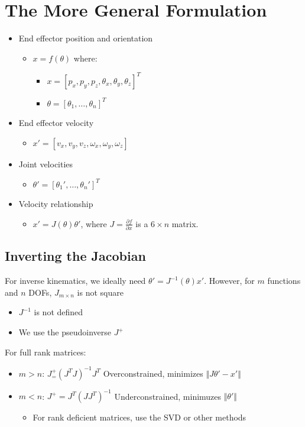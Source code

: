 \documentclass{article}
\begin{document}
\section*{The More General Formulation}
\begin{itemize}
    \item End effector position and orientation
    \begin{itemize}
        \item $x = f(\theta)$ where:
        \begin{itemize}
            \item $x = [p_x, p_y, p_z, \theta_x, \theta_y, \theta_z]^T$
            \item $\theta = [\theta_1, \dots, \theta_n]^T$
        \end{itemize}
    \end{itemize}
    \item End effector velocity
    \begin{itemize}
        \item $x' = [v_x, v_y, v_z, \omega_x, \omega_y, \omega_z]$
    \end{itemize}
    \item Joint velocities
    \begin{itemize}
        \item $\theta' = [\theta_1', \dots, \theta_n']^T$
    \end{itemize}
    \item Velocity relationship
    \begin{itemize}
        \item $x' = J(\theta) \theta'$, where $J = \frac{\partial f}{\partial x}$ is a $6 \times n$ matrix.
    \end{itemize}
\end{itemize}

\subsection*{Inverting the Jacobian}
For inverse kinematics, we ideally need $\theta' = J^{-1}(\theta)x'$.  However, for $m$ functions and $n$ DOFs, $J_{m \times n}$ is not square
\begin{itemize}
    \item $J^{-1}$ is not defined
    \item We use the pseudoinverse $J^+$
\end{itemize}
For full rank matrices:
\begin{itemize}
    \item $m > n$: $J^+_ = (J^T J)^{-1} J^T$  Overconstrained, minimizes $\Vert J\theta' - x'\Vert$ 
    \item $m < n$: $J^+ = J^T(JJ^T)^{-1}$  Underconstrained, minimuzes $\Vert \theta' \Vert$
    \begin{itemize}
        \item For rank deficient matrices, use the SVD or other methods
    \end{itemize}
\end{itemize}
\end{document}
